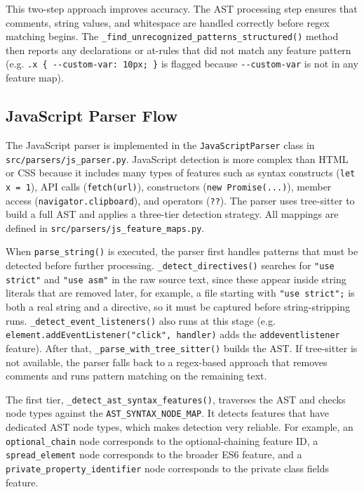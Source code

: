 This two-step approach improves accuracy. The AST processing step ensures that comments, string values, and whitespace are handled correctly before regex matching begins. The \texttt{\_find\_unrecognized\_patterns\_structured()} method then reports any declarations or at-rules that did not match any feature pattern (e.g. \texttt{.x \{ -{}-custom-var: 10px; \}} is flagged because \texttt{-{}-custom-var} is not in any feature map).

\subsection{JavaScript Parser Flow}

The JavaScript parser is implemented in the \texttt{JavaScriptParser} class in \texttt{src/parsers/js\_parser.py}. JavaScript detection is more complex than HTML or CSS because it includes many types of features such as syntax constructs (\texttt{let x = 1}), API calls (\texttt{fetch(url)}), constructors (\texttt{new Promise(...)}), member access (\texttt{navigator.clipboard}), and operators (\texttt{??}). The parser uses tree-sitter to build a full AST and applies a three-tier detection strategy. All mappings are defined in \texttt{src/parsers/js\_feature\_maps.py}.

When \texttt{parse\_string()} is executed, the parser first handles patterns that must be detected before further processing. \texttt{\_detect\_directives()} searches for \texttt{"use strict"} and \texttt{"use asm"} in the raw source text, since these appear inside string literals that are removed later, for example, a file starting with \texttt{"use strict";} is both a real string and a directive, so it must be captured before string-stripping runs. \texttt{\_detect\_event\_listeners()} also runs at this stage (e.g. \texttt{element.addEventListener("click", handler)} adds the \texttt{addeventlistener} feature). After that, \texttt{\_parse\_with\_tree\_sitter()} builds the AST. If tree-sitter is not available, the parser falls back to a regex-based approach that removes comments and runs pattern matching on the remaining text.

The first tier, \texttt{\_detect\_ast\_syntax\_features()}, traverses the AST and checks node types against the \texttt{AST\_SYNTAX\_NODE\_MAP}. It detects features that have dedicated AST node types, which makes detection very reliable. For example, an \texttt{optional\_chain} node corresponds to the optional-chaining feature ID, a \texttt{spread\_element} node corresponds to the broader ES6 feature, and a \texttt{private\_property\_identifier} node corresponds to the private class fields feature.

